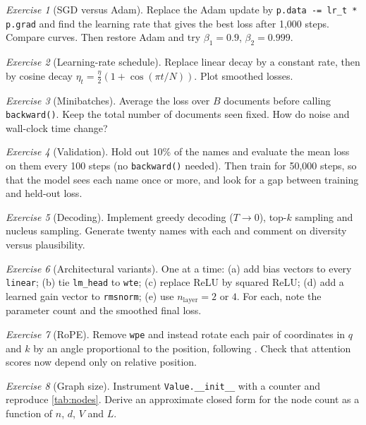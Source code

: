 \documentclass[11pt,letterpaper]{article}
\theoremstyle{remark}
\newtheorem{exercise}{Exercise}
\newcommand{\code}[1]{\lstinline[basicstyle=\ttfamily\small]|#1|}
\begin{document}
\begin{exercise}[SGD versus Adam]
Replace the Adam update by \code{p.data -= lr_t * p.grad} and find the learning rate that gives the best loss after 1{,}000 steps. Compare curves. Then restore Adam and try $\beta_1=0.9$, $\beta_2=0.999$.
\end{exercise}

\begin{exercise}[Learning-rate schedule]
Replace linear decay by a constant rate, then by cosine decay $\eta_t = \tfrac{\eta}{2}(1+\cos(\pi t/N))$. Plot smoothed losses.
\end{exercise}

\begin{exercise}[Minibatches]
Average the loss over $B$ documents before calling \code{backward()}. Keep the total number of documents seen fixed. How do noise and wall-clock time change?
\end{exercise}

\begin{exercise}[Validation]
Hold out 10\% of the names and evaluate the mean loss on them every 100 steps (no \code{backward()} needed). Then train for 50{,}000 steps, so that the model sees each name once or more, and look for a gap between training and held-out loss.
\end{exercise}

\begin{exercise}[Decoding]
Implement greedy decoding ($T\to 0$), top-$k$ sampling and nucleus sampling. Generate twenty names with each and comment on diversity versus plausibility.
\end{exercise}

\begin{exercise}[Architectural variants]
One at a time: (a) add bias vectors to every \code{linear}; (b) tie \code{lm_head} to \code{wte}; (c) replace ReLU by squared ReLU; (d) add a learned gain vector to \code{rmsnorm}; (e) use $n_{\text{layer}}=2$ or $4$. For each, note the parameter count and the smoothed final loss.
\end{exercise}

\begin{exercise}[RoPE]
Remove \code{wpe} and instead rotate each pair of coordinates in $q$ and $k$ by an angle proportional to the position, following \textcite{su2021rope}. Check that attention scores now depend only on relative position.
\end{exercise}

\begin{exercise}[Graph size]
Instrument \code{Value.__init__} with a counter and reproduce \cref{tab:nodes}. Derive an approximate closed form for the node count as a function of $n$, $d$, $V$ and $L$.
\end{exercise}
\end{document}
